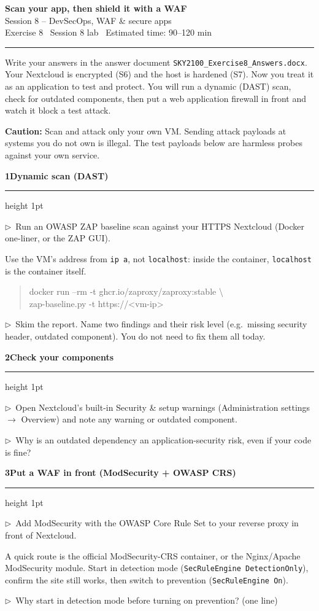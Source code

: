 \documentclass[11pt]{article}
\newcommand{\wbsection}[1]{\par\vspace{11pt}\noindent
  {\large\bfseries\color{kred}#1}\par\vspace{2pt}
  {\color{kred!35}\hrule height 1pt}\par\vspace{6pt}}
\newcommand{\task}[1]{\par\vspace{4pt}\noindent
  \textcolor{kred}{\textbf{$\triangleright$}}~#1\par\vspace{2pt}}
\renewcommand{\emph}[1]{\textup{#1}}
\newcommand{\cmd}[1]{\texttt{#1}}
\begin{document}
\begin{center}
  {\LARGE\bfseries Scan your app, then shield it with a WAF}\\[3pt]
  {\large Session 8 -- DevSecOps, WAF \& secure apps}\\[5pt]
  {\small Exercise 8 \textperiodcentered\ Session 8 lab \textperiodcentered\ Estimated time: 90--120 min}
\end{center}
\vspace{2pt}\hrule\vspace{1.1em}

Write your answers in the answer document \cmd{SKY2100\_Exercise8\_Answers.docx}. Your Nextcloud is encrypted (S6) and the host is hardened (S7). Now you treat it as
an \emph{application} to test and protect. You will run a dynamic (DAST) scan, check for outdated
components, then put a web application firewall in front and watch it block a test attack.

\noindent\textbf{Caution:} Scan and attack only your \emph{own} VM. Sending attack payloads at systems
you do not own is illegal. The test payloads below are harmless probes against your own service.

\wbsection{1\quad Dynamic scan (DAST)}
\task{Run an OWASP ZAP baseline scan against your HTTPS Nextcloud (Docker one-liner, or the ZAP GUI).}
Use the VM's address from \cmd{ip a}, not \cmd{localhost}: inside the container, \cmd{localhost} is the
container itself.
\begin{quote}\ttfamily
docker run --rm -t ghcr.io/zaproxy/zaproxy:stable \textbackslash\\
\quad zap-baseline.py -t https://<vm-ip>
\end{quote}
\task{Skim the report. Name two findings and their risk level (e.g.\ missing security header, outdated
component). You do not need to fix them all today.}

\wbsection{2\quad Check your components}
\task{Open Nextcloud's built-in \emph{Security \& setup warnings} (Administration settings $\rightarrow$
Overview) and note any warning or outdated component.}
\task{Why is an outdated dependency an application-security risk, even if \emph{your} code is fine?}

\wbsection{3\quad Put a WAF in front (ModSecurity + OWASP CRS)}
\task{Add ModSecurity with the OWASP Core Rule Set to your reverse proxy in front of Nextcloud.}
A quick route is the official ModSecurity-CRS container, or the Nginx/Apache ModSecurity module. Start
in \emph{detection} mode (\cmd{SecRuleEngine DetectionOnly}), confirm the site still works, then switch
to \emph{prevention} (\cmd{SecRuleEngine On}).
\task{Why start in detection mode before turning on prevention? (one line)}
\end{document}

